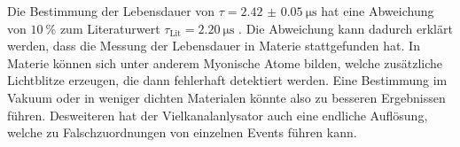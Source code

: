 Die Bestimmung der Lebensdauer von $\tau = \SI{2.42(5)}{\micro\second}$ hat eine Abweichung von $\SI{10}{\percent}$ zum 
Literaturwert $\tau_{\text{Lit}} = \SI{2.20}{\micro\second}$ \cite{PDG}. Die Abweichung kann 
dadurch erklärt werden, dass die Messung der Lebensdauer in Materie stattgefunden hat. In Materie können 
sich unter anderem Myonische Atome bilden, welche zusätzliche Lichtblitze erzeugen, die dann 
fehlerhaft detektiert werden.
Eine Bestimmung im Vakuum oder in weniger dichten Materialen könnte also zu besseren Ergebnissen 
führen. Desweiteren hat der Vielkanalanlysator auch eine endliche Auflösung, welche zu Falschzuordnungen von einzelnen Events führen kann.

